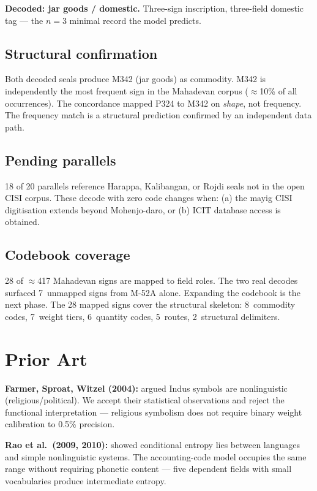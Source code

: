 \textbf{Decoded: jar goods / domestic.}
Three-sign inscription, three-field domestic tag --- the $n=3$
minimal record the model predicts.

\subsection{Structural confirmation}

Both decoded seals produce M342 (jar goods) as commodity.
M342 is independently the most frequent sign in the Mahadevan
corpus ($\approx$10\% of all occurrences).
The concordance mapped P324 to M342 on \emph{shape}, not frequency.
The frequency match is a structural prediction confirmed by an
independent data path.

\subsection{Pending parallels}

18 of 20 parallels reference Harappa, Kalibangan, or Rojdi seals
not in the open CISI corpus.
These decode with zero code changes when:
(a) the mayig CISI digitisation extends beyond
Mohenjo-daro,\smartcite{MayigCISI} or
(b) ICIT database access is
obtained.\smartcite{WellsFuls2006}

\subsection{Codebook coverage}

28 of $\approx$417 Mahadevan signs are mapped to field roles.
The two real decodes surfaced 7~unmapped signs from M-52A alone.
Expanding the codebook is the next phase.
The 28 mapped signs cover the structural skeleton: 8~commodity
codes, 7~weight tiers, 6~quantity codes, 5~routes,
2~structural delimiters.

\section{Prior Art}

\textbf{Farmer, Sproat, Witzel (2004):}\smartcite{FSW2004}
argued Indus symbols are nonlinguistic (religious/political).
We accept their statistical observations and reject the functional
interpretation --- religious symbolism does not require binary
weight calibration to 0.5\% precision.

\textbf{Rao et al.\ (2009, 2010):}\smartcite{Rao2009}
showed conditional entropy lies between languages and simple
nonlinguistic systems. The accounting-code model occupies the same
range without requiring phonetic content --- five dependent fields
with small vocabularies produce intermediate entropy.

